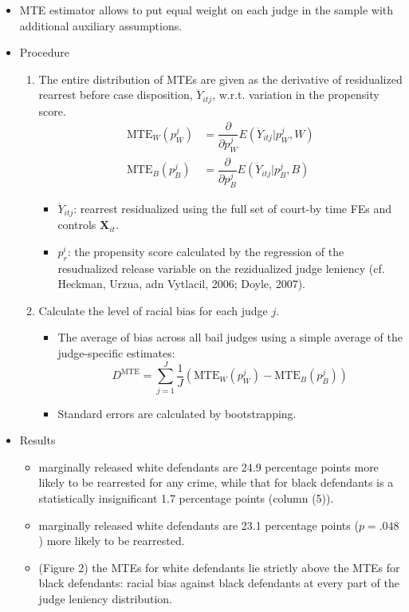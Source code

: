 \documentclass[../root]{subfiles}
\begin{document}
    \begin{itemize}
      \item MTE estimator allows to put equal weight on each judge in the sample with additional auxiliary assumptions.
      \item Procedure
      \begin{enumerate}
        \item The entire distribution of MTEs are given as the derivative of residualized rearrest before case disposition, $\ddot{Y}_{itj}$, w.r.t. variation in the propensity score.
        \begin{align*}
          \text{MTE}_W \left(p_W^j \right) &= \dfrac{\partial}{\partial p_W^j} E(\ddot{Y}_{itj} | p_W^j, W) \\
          \text{MTE}_B \left(p_B^j \right) &= \dfrac{\partial}{\partial p_B^j} E(\ddot{Y}_{itj} | p_B^j, B)
        \end{align*}
        \begin{itemize}
          \item $\ddot{Y}_{itj}$: rearrest residualized using the full set of court-by time FEs and controls $\mathbf{X}_{it}$.
          \item $p_r^i$: the propensity score calculated by the regression of the resudualized release variable on the rezidualized judge leniency (cf. Heckman, Urzua, adn Vytlacil, 2006; Doyle, 2007).
        \end{itemize}
        \item Calculate the level of racial bias for each judge $j$.
        \begin{itemize}
          \item The average of bias across all bail judges using a simple average of the judge-specific estimates:
          \[
          D^{\text{MTE}} = \sum_{j = 1}^J \dfrac{1}{J} \left( \text{MTE}_W(p_W^j) - \text{MTE}_B(p_B^j) \right)
          \]
          \item Standard errors are calculated by bootstrapping.
        \end{itemize}
      \end{enumerate}
      \item Results
      \begin{itemize}
        \item marginally released white defendants are 24.9 percentage points more likely to be rearrested for any crime, while that for black defendants is a statistically insignificant 1.7 percentage points (column (5)).
        \item marginally released white defendants are 23.1 percentage points ($p = .048$) more likely to be rearrested.
        \item (Figure 2) the MTEs for white defendants lie strictly above the MTEs for black defendants: racial bias against black defendants at every part of the judge leniency distribution.
      \end{itemize}
    \end{itemize}
\end{document}
